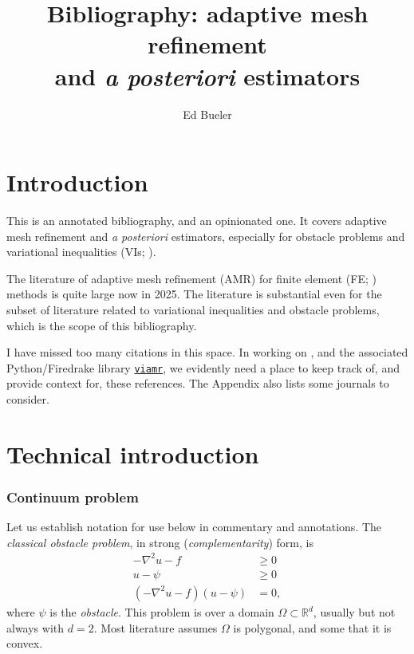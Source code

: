 \documentclass[11pt]{article}
\title{Bibliography: adaptive mesh refinement \\ and \emph{a posteriori} estimators}
\author{Ed Bueler}
\newcommand{\RR}{\ensuremath{\mathbb R}}
\begin{document}
\maketitle

\section{Introduction}

This is an annotated bibliography, and an opinionated one.  It covers adaptive mesh refinement and \emph{a posteriori} estimators, especially for obstacle problems and variational inequalities (VIs; \cite{KinderlehrerStampacchia1980}).

The literature of adaptive mesh refinement (AMR) for finite element (FE; \cite{ElmanSilvesterWathen2014}) methods is quite large now in 2025.  The literature is substantial even for the subset of literature related to variational inequalities and obstacle problems, which is the scope of this bibliography.

I have missed too many citations in this space.  In working on \cite{FochesattoBueler2025}, and the associated Python/Firedrake library  \href{https://github.com/StefanoFochesatto/viamr}{\texttt{viamr}}, we evidently need a place to keep track of, and provide context for, these references.  The Appendix also lists some journals to consider.

\section{Technical introduction}

\subsubsection*{Continuum problem}  Let us establish notation for use below in commentary and annotations.  The \emph{classical obstacle problem}, in strong (\emph{complementarity}) form, is
\begin{subequations} \label{eq:ncp:classical}
\begin{align}
  -\nabla^2 u - f &\geq 0 \\
  u - \psi &\geq 0 \\
  (-\nabla^2u - f)(u - \psi) &= 0,
\end{align}
\end{subequations}
where $\psi$ is the \emph{obstacle}.  This problem is over a domain $\Omega \subset \RR^d$, usually but not always with $d=2$.   Most literature assumes $\Omega$ is polygonal, and some that it is convex.
\end{document}
